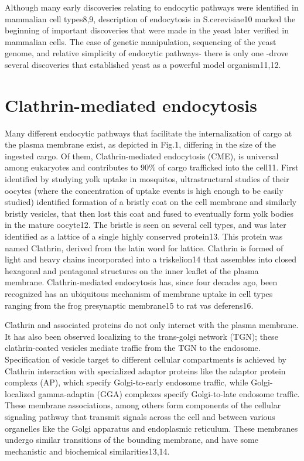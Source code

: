 \vspace{5mm}
Although many early discoveries relating to endocytic pathways were identified in mammalian cell types8,9, description of endocytosis in S.cerevisiae10 marked the beginning of important discoveries that were made in the yeast later verified in mammalian cells. The ease of genetic manipulation, sequencing of the yeast genome, and relative simplicity of endocytic pathways- there is only one -drove several discoveries that established yeast as a powerful model organism11,12.


\section{Clathrin-mediated endocytosis}
Many different endocytic pathways that facilitate the internalization of cargo at the plasma membrane exist, as depicted in Fig.1, differing in the size of the ingested cargo. Of them, Clathrin-mediated endocytosis (CME), is universal among eukaryotes and contributes to 90\% of cargo trafficked into the cell11. First identified by studying yolk uptake in mosquitos, ultrastructural studies of their oocytes (where the concentration of uptake events is high enough to be easily studied) identified formation of a bristly coat on the cell membrane and similarly bristly vesicles, that then lost this coat and fused to eventually form yolk bodies in the mature oocyte12. The bristle is seen on several cell types, and was later identified as a lattice of a single highly conserved protein13. This protein was named Clathrin, derived from the latin word for lattice. Clathrin is formed of light and heavy chains incorporated into a triskelion14 that assembles into closed hexagonal and pentagonal structures on the inner leaflet of the plasma membrane. Clathrin-mediated endocytosis has, since four decades ago, been recognized has an ubiquitous mechanism of membrane uptake in cell types ranging from the frog presynaptic membrane15 to rat vas deferens16. 

\vspace{5mm}
Clathrin and associated proteins do not only interact with the plasma membrane. It has also been observed localizing to the trans-golgi network (TGN); these clathrin-coated vesicles mediate traffic from the TGN to the endosome. Specification of vesicle target to different cellular compartments is achieved by Clathrin interaction with specialized adaptor proteins like the adaptor protein complexs (AP), which specify Golgi-to-early endosome traffic, while Golgi-localized gamma-adaptin (GGA) complexes specify Golgi-to-late endosome traffic. These membrane associations, among others form components of the cellular signaling pathway that transmit signals across the cell and between various organelles like the Golgi apparatus and endoplasmic reticulum. These membranes undergo similar transitions of the bounding membrane, and have some mechanistic and biochemical similarities13,14. 

